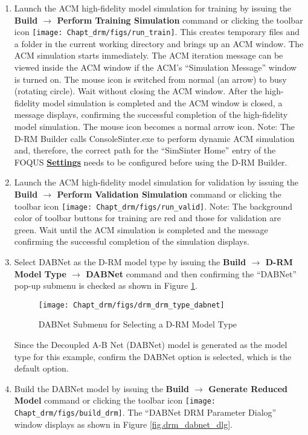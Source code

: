 \begin{enumerate}
	\item Launch the ACM high-fidelity model simulation for training by issuing the \textbf{Build $\rightarrow$ Perform Training Simulation} command or clicking the toolbar icon \texttt{[image: Chapt\_drm/figs/run\_train]}.  This creates temporary files and a folder in the current working directory and brings up an ACM window.  The ACM simulation starts immediately.  The ACM iteration message can be viewed inside the ACM window if the ACM’s ``Simulation Message'' window is turned on.  The mouse icon is switched from normal (an arrow) to busy (rotating circle).  Wait without closing the ACM window.  After the high-fidelity model simulation is completed and the ACM window is closed, a message displays, confirming the successful completion of the high-fidelity model simulation.  The mouse icon becomes a normal arrow icon.  Note: The D-RM Builder calls ConsoleSinter.exe to perform dynamic ACM simulation and, therefore, the correct path for the ``SimSinter Home'' entry of the FOQUS \textbf{\underline{Settings}} needs to be configured before using the D-RM Builder.
	\item Launch the ACM high-fidelity model simulation for validation by issuing the \textbf{Build $\rightarrow$ Perform Validation Simulation} command or clicking the toolbar icon \texttt{[image: Chapt\_drm/figs/run\_valid]}.  Note: The background color of toolbar buttons for training are red and those for validation are green.  Wait until the ACM simulation is completed and the message confirming the successful completion of the simulation displays.
	\item Select DABNet as the D-RM model type by issuing the \textbf{Build $\rightarrow$ D-RM Model Type $\rightarrow$ DABNet} command and then confirming the ``DABNet'' pop-up submenu is checked as shown in Figure \ref{fig.drm_drm_type_dabnet}.
	\begin{figure}[H]
		\begin{center}
			\texttt{[image: Chapt\_drm/figs/drm\_drm\_type\_dabnet]}
			\caption{DABNet Submenu for Selecting a D-RM Model Type}
			\label{fig.drm_drm_type_dabnet}
		\end{center}
	\end{figure}
	Since the Decoupled A-B Net (DABNet) model is generated as the model type for this example, confirm the DABNet option is selected, which is the default option.
	\item Build the DABNet model by issuing the \textbf{Build $\rightarrow$ Generate Reduced Model} command or clicking the toolbar icon \texttt{[image: Chapt\_drm/figs/build\_drm]}.  The ``DABNet DRM Parameter Dialog'' window displays as shown in Figure \ref{fig.drm_dabnet_dlg}.

\end{enumerate}
